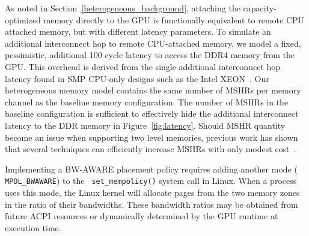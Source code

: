 As noted in Section~\ref{heterogeneous_background}, attaching the capacity-optimized memory
directly to the GPU is functionally equivalent to remote CPU attached memory,
but with different latency parameters.  To simulate an additional interconnect hop
to remote CPU-attached memory, we model a fixed, pessimistic, additional 100 cycle latency to access
the DDR4 memory from the GPU\@. This overhead is derived from the single additional interconnect
hop latency found in SMP CPU-only designs such as the Intel XEON~\cite{INTELXEON}\@.
% 
{\color{black}Our heterogeneous
memory model contains the same number of MSHRs per memory channel as the baseline
memory configuration.  The number of MSHRs in the
baseline configuration is sufficient to effectively hide the additional interconnect
latency to the DDR memory in Figure~\ref{fig:latency}. Should MSHR quantity become an issue
when supporting two level memories, previous work has shown that several techniques
can efficiently increase MSHRs with only modest cost~\cite{ref:tuck:scalablemisshandling, ref:minikin:prefetch}.}


{\color{black}
Implementing a BW-AWARE placement policy requires adding another mode ({\tt
MPOL\_BWAWARE}) to the {\tt
set\_mempolicy()} system call in Linux\@. When a process uses this mode, the Linux
kernel will allocate pages from the two memory zones in the ratio of their
bandwidths.  These bandwidth ratios may be obtained from future ACPI resources or dynamically
determined by the GPU runtime at execution time.}

